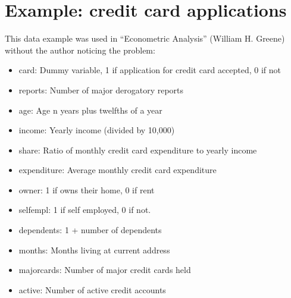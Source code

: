 \documentclass[letterpaper,10pt,english]{jupyterBook}
\begin{document}
\section{Example: credit card applications}
\label{\detokenize{dependent_data:example-credit-card-applications}}
\sphinxAtStartPar
This data example was used in “Econometric Analysis” (William H. Greene) without the author noticing the problem:
\begin{itemize}
\item {} 
\sphinxAtStartPar
card: Dummy variable, 1 if application for credit card accepted, 0 if not

\item {} 
\sphinxAtStartPar
reports: Number of major derogatory reports

\item {} 
\sphinxAtStartPar
age: Age n years plus twelfths of a year

\item {} 
\sphinxAtStartPar
income: Yearly income (divided by 10,000)

\item {} 
\sphinxAtStartPar
share: Ratio of monthly credit card expenditure to yearly income

\item {} 
\sphinxAtStartPar
expenditure: Average monthly credit card expenditure

\item {} 
\sphinxAtStartPar
owner: 1 if owns their home, 0 if rent

\item {} 
\sphinxAtStartPar
selfempl: 1 if self employed, 0 if not.

\item {} 
\sphinxAtStartPar
dependents: 1 + number of dependents

\item {} 
\sphinxAtStartPar
months: Months living at current address

\item {} 
\sphinxAtStartPar
majorcards: Number of major credit cards held

\item {} 
\sphinxAtStartPar
active: Number of active credit accounts

\end{itemize}
\end{document}
